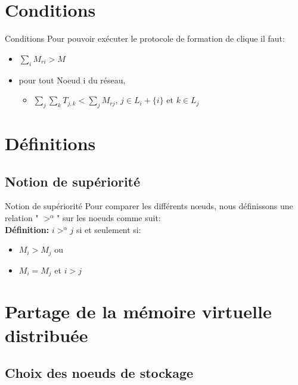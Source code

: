 \documentclass[10pt, c]{beamer}
\begin{document}
\section{Conditions}
		\begin{frame}{Conditions}
			\transwipe
			\vspace{-0.25cm}
		Pour pouvoir exécuter le protocole de formation de clique il faut: 
    \begin{itemize}
        \item $\sum_{i}M_{ri} > M$
        \item pour tout Noeud i du réseau, 
        \begin{itemize}
            \item $\sum_{j}\sum_{k}T_{j,k} < \sum_{j}M_{rj}$, $j\in{L_{i} +\{i\}} $ et $k \in{L_{j}}$
        \end{itemize}
    \end{itemize}
\end{frame}
\section{Définitions}
    \subsection{Notion de supériorité}
        \begin{frame}{Notion de supériorité}
            Pour comparer les  différents nœuds, nous définissons une relation " $>^\alpha$" sur les noeuds comme suit:\\
            \vspace{5mm}
            \textbf{Définition: }  $ i >^{\alpha} j$ si et seulement si:
            \begin{itemize}
                \item $M_{i} > M_{j}$ ou
                \item $M_{i} = M_{j}$ et $i > j$
            \end{itemize}
        \end{frame}
\section{Partage de la mémoire virtuelle distribuée}
    \subsection{Choix des noeuds de stockage}
\end{document}
